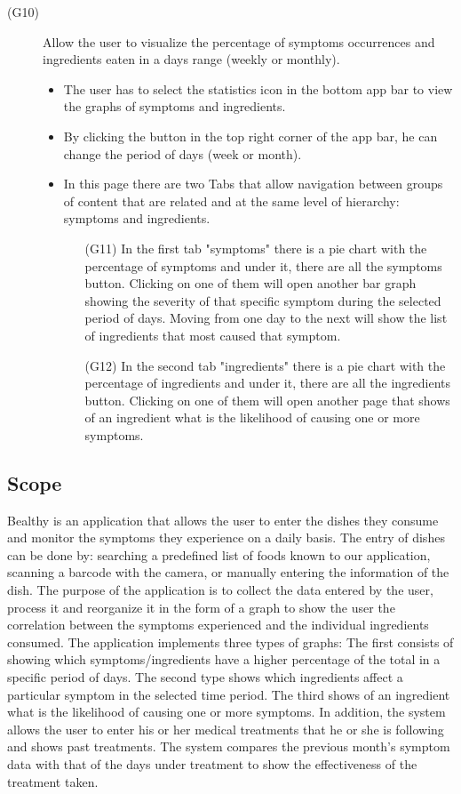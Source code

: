 \documentclass [12pt]{article}
\begin{document}
\begin{description}
\item[(G10)]Allow the user to visualize the percentage of symptoms occurrences and ingredients eaten in a days range (weekly or monthly).
\begin{itemize}
\item The user has to select the statistics icon in the bottom app bar to view the graphs of symptoms and ingredients. 
\item By clicking the button in the top right corner of the app bar, he can change the period of days (week or month). 
\item In this page there are two Tabs that allow navigation between groups of content that are related and at the same level of hierarchy: symptoms and ingredients.
\begin{itemize}[•]
\item[(G11)] In the first tab "symptoms" there is a pie chart with the percentage of symptoms and under it, there are all the symptoms button. Clicking on one of them will open another bar graph showing the severity of that specific symptom during the selected period of days. Moving from one day to the next will show the list of ingredients that most caused that symptom.
\item[(G12)] In the second tab "ingredients" there is a pie chart with the percentage of ingredients and under it, there are all the ingredients button. Clicking on one of them will open another page that shows of an ingredient what is the likelihood of causing one or more symptoms.
\end{itemize}
\end{itemize}
\end{description}


\subsection{Scope}
Bealthy is an application that allows the user to enter the dishes they consume and monitor the symptoms they experience on a daily basis. 
The entry of dishes can be done by: searching a predefined list of foods known to our application, scanning a barcode with the camera, or manually entering the information of the dish.
The purpose of the application is to collect the data entered by the user, process it and reorganize it in the form of a graph to show the user the correlation between the symptoms experienced and the individual ingredients consumed.
The application implements three types of graphs:
The first consists of showing which symptoms/ingredients have a higher percentage of the total in a specific period of days.
The second type shows which ingredients affect a particular symptom in the selected time period.
The third shows of an ingredient what is the likelihood of causing one or more symptoms.
In addition, the system allows the user to enter his or her medical treatments that he or she is following and shows past treatments.
The system compares the previous month's symptom data with that of the days under treatment to show the effectiveness of the treatment taken.
\end{document}
